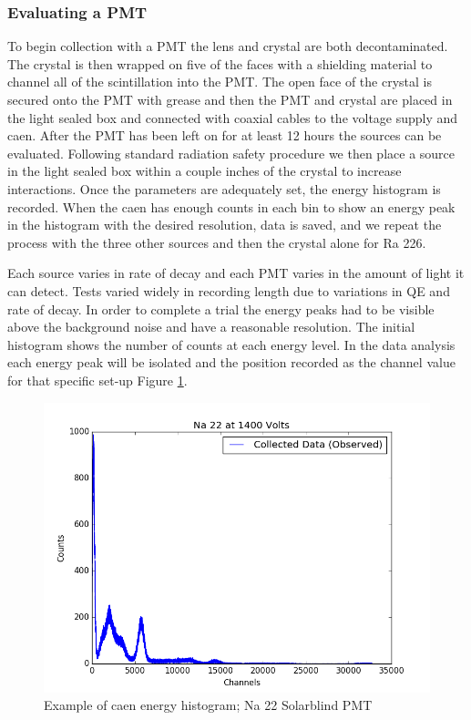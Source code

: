 \documentclass[aip, jmp, amsmath, amssymb, reprint, floatfix]{revtex4-1}
\begin{document}
\subsubsection{\label{sec:level3}Evaluating a PMT}

To begin collection with a PMT the lens and crystal are both decontaminated. The crystal is then wrapped on five of the faces with a shielding material to channel all of the scintillation into the PMT. The open face of the crystal is secured onto the PMT with grease and then the PMT and crystal are placed in the light sealed box and connected with coaxial cables to the voltage supply and caen. After the PMT has been left on for at least 12 hours the sources can be evaluated. Following standard radiation safety procedure we then place a source in the light sealed box within a couple inches of the crystal to increase interactions. Once the parameters are adequately set, the energy histogram is recorded. When the caen has enough counts in each bin to show an energy peak in the histogram with the desired resolution, data is saved, and we repeat the process with the three other sources and then the crystal alone for Ra 226. 

Each source varies in rate of decay and each PMT varies in the amount of light it can detect. Tests varied widely in recording length due to variations in QE and rate of decay. In order to complete a trial the energy peaks had to be visible above the background noise and have a reasonable resolution. The initial histogram shows the number of counts at each energy level. In the data analysis each energy peak will be isolated and the position recorded as the channel value for that specific set-up Figure \ref{fig:exhist}. 

\begin{figure}
  \centering
    \includegraphics[width=.8\columnwidth]{na.png}
  \caption{Example of caen energy histogram; Na 22 Solarblind PMT}
  \label{fig:exhist}
\end{figure} 
\end{document}
